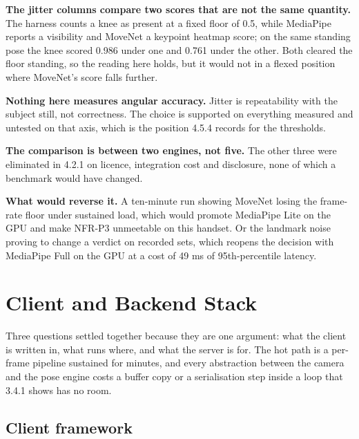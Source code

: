 \textbf{The jitter columns compare two scores that are not the same quantity.} The harness counts a knee as present at a fixed floor of 0.5, while MediaPipe reports a visibility and MoveNet a keypoint heatmap score; on the same standing pose the knee scored 0.986 under one and 0.761 under the other. Both cleared the floor standing, so the reading here holds, but it would not in a flexed position where MoveNet's score falls further.

\textbf{Nothing here measures angular accuracy.} Jitter is repeatability with the subject still, not correctness. The choice is supported on everything measured and untested on that axis, which is the position 4.5.4 records for the thresholds.

\textbf{The comparison is between two engines, not five.} The other three were eliminated in 4.2.1 on licence, integration cost and disclosure, none of which a benchmark would have changed.

\textbf{What would reverse it.} A ten-minute run showing MoveNet losing the frame-rate floor under sustained load, which would promote MediaPipe Lite on the GPU and make NFR-P3 unmeetable on this handset. Or the landmark noise proving to change a verdict on recorded sets, which reopens the decision with MediaPipe Full on the GPU at a cost of 49 ms of 95th-percentile latency.

\section{Client and Backend Stack}
\label{sec:4.3}

Three questions settled together because they are one argument: what the client is written in, what runs where, and what the server is for. The hot path is a per-frame pipeline sustained for minutes, and every abstraction between the camera and the pose engine costs a buffer copy or a serialisation step inside a loop that 3.4.1 shows has no room.

\subsection{Client framework}
\label{sec:4.3.1}

